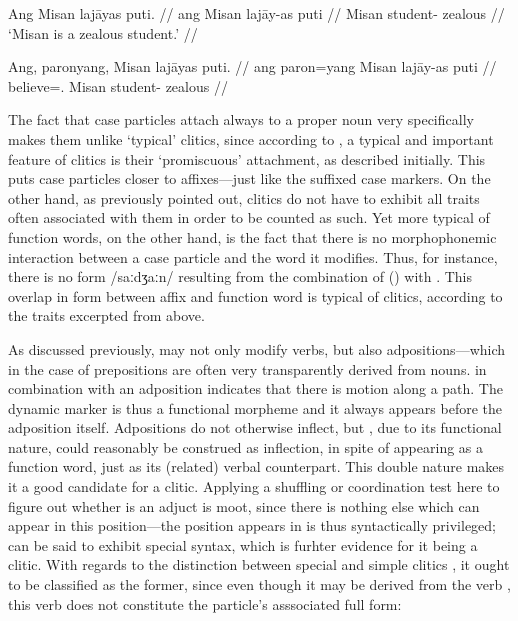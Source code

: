 \pex\label{ex:clitics_11}
\a\label{ex:clitics_11a}\begingl
	\gla Ang Misan lajāyas puti. //
	\glb ang Misan lajāy-as puti //
	\glc \Aarg{} Misan student-\Parg{} zealous //
	\glft `Misan is a zealous student.' //
\endgl

\a\label{ex:clitics_11b}\ljudge{*}\begingl
	\gla Ang, paronyang, Misan lajāyas puti. //
	\glb ang paron=yang Misan lajāy-as puti //
	\glc \Aarg{} believe=\Fsg{}.\Aarg{} Misan student-\Parg{} zealous //
\endgl
\xe

The fact that case particles attach always to a proper noun very specifically
makes them unlike `typical' clitics, since according to
\citet{spencerluis2012}, a typical and important feature of clitics is their
`promiscuous' attachment, as described initially. This puts case particles
closer to affixes---just like the suffixed case markers. On the other hand, as
previously pointed out, clitics do not have to exhibit all traits often
associated with them in order to be counted as such. Yet more typical of
function words, on the other hand, is the fact that there is no morphophonemic
interaction between a case particle and the word it modifies. Thus, for
instance, there is no form /saːdʒaːn/ resulting from the combination of
 (\Parg{}) with . This overlap in form between
affix and function word is typical of clitics, according to the traits
excerpted from \citet{spencerluis2012} above.

As discussed previously,  may not only modify verbs, but also
ad\-posi\-tions---which in the case of prepositions are often very
transparently derived from nouns.  in combination with an
adposition  indicates that there is motion along a path. The
dynamic marker  is thus a functional morpheme and it always
appears before the adposition itself. Adpositions do not otherwise inflect, but
, due to its functional nature, could reasonably be construed
as inflection, in spite of appearing as a function word, just as its (related)
verbal counterpart. This double nature makes it a good candidate for a clitic.
Applying a shuffling or coordination test here to figure out whether
 is an adjuct is moot, since there is nothing else which can
appear in this position---the position  appears in is thus
syntactically privileged;  can be said to exhibit special
syntax, which is furhter evidence for it being a clitic. With regards to the
distinction between special and simple clitics \citep{zwicky1977}, it ought to
be classified as the former, since even though it may be derived from the verb
, this verb does not constitute the particle's asssociated full
form:

